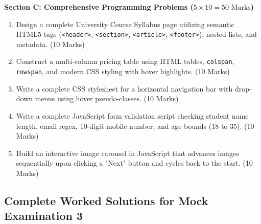 \begin{mockexam}
\medskip
\noindent\textbf{Section C: Comprehensive Programming Problems ($5 \times 10 = 50\text{ Marks}$)}
\begin{enumerate}[leftmargin=1.5em, start=17]
    \item Design a complete University Course Syllabus page utilizing semantic HTML5 tags (\texttt{<header>}, \texttt{<section>}, \texttt{<article>}, \texttt{<footer>}), nested lists, and metadata. (10 Marks)
    \item Construct a multi-column pricing table using HTML tables, \texttt{colspan}, \texttt{rowspan}, and modern CSS styling with hover highlights. (10 Marks)
    \item Write a complete CSS stylesheet for a horizontal navigation bar with drop-down menus using hover pseudo-classes. (10 Marks)
    \item Write a complete JavaScript form validation script checking student name length, email regex, 10-digit mobile number, and age bounds (18 to 35). (10 Marks)
    \item Build an interactive image carousel in JavaScript that advances images sequentially upon clicking a "Next" button and cycles back to the start. (10 Marks)
\end{enumerate}
\end{mockexam}

\subsection{Complete Worked Solutions for Mock Examination 3}

